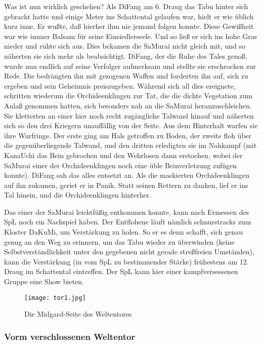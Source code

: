 \documentclass[
a4paper,
twoside,
DIV=calc,
BCOR=4mm,
fontsize=9pt,
twocolumn=on,
titlepage=on,
parskip=half
]{scrartcl}
\begin{document}
Was ist nun wirklich geschehen? Als DiFang am 6. Draug das Tabu hinter
sich gebracht hatte und einige Meter ins Schattental gelaufen war,
hielt er wie üblich kurz inne. Er wußte, daß hierher ihm nie jemand
folgen konnte. Diese Gewißheit war wie immer Balsam für seine
Einsiedlerseele. Und so ließ er sich ins hohe Gras nieder und ruhte
sich aus. Dies bekamen die SaMurai nicht gleich mit, und so näherten
sie sich mehr als beabsichtigt. DiFang, der die Ruhe des Tales genoß,
wurde nun endlich auf seine Verfolger aufmerksam und stellte sie
erschrocken zur Rede. Die bedrängten ihn mit gezogenen Waffen und
forderten ihn auf, sich zu ergeben und sein Geheimnis
preiszugeben. Während sich all dies ereignete, schritten wiederum die
Orchideenklingen zur Tat, die die dichte Vegetation zum Anlaß genommen
hatten, sich besonders nah an die SaMurai heranzuschleichen. Sie
kletterten an einer hier noch recht zugängliche Talwand hinauf und
näherten sich so den drei Kriegern unauffällig von der Seite. Aus dem
Hinterhalt warfen sie ihre Wurfringe. Der erste ging am Hals getroffen
zu Boden, der zweite floh über die gegenüberliegende Talwand, und den
dritten erledigten sie im Nahkampf (mit KanaUchi das Bein gebrochen
und den Wehrlosen dann erstochen, wobei der SaMurai einer der
Orchideenklingen noch eine üble Beinverletzung zufügen konnte). DiFang
sah das alles entsetzt an. Als die maskierten Orchideenklingen auf ihn
zukamen, geriet er in Panik. Statt seinen Rettern zu danken, lief er
ins Tal hinein, und die Orchideenklingen hinterher.

Das einer der SaMurai leichtfüßig entkommen konnte, kann nach Ermessen
des SpL noch ein Nachspiel haben. Der Entflohene läuft nämlich
schnurstracks zum Kloster DaKuMi, um Verstärkung zu holen. So er es
denn schafft, sich genau genug an den Weg zu erinnern, um das Tabu
wieder zu überwinden (keine Selbstverständlichkeit unter den gegebenen
nicht gerade streßfreien Umständen), kann die Verstärkung (in vom SpL
zu bestimmender Stärke) frühestens am 12. Draug im Schattental
eintreffen. Der SpL kann hier einer kampfversessenen Gruppe eine Show
bieten.

\begin{figure*}[t]
  \centering
  \texttt{[image: tor1.jpg]}
  \caption{Die Midgard-Seite des Weltentores}
  \label{fig:tor1}
\end{figure*}

\subsubsection{Vorm verschlossenen Weltentor}
\end{document}
